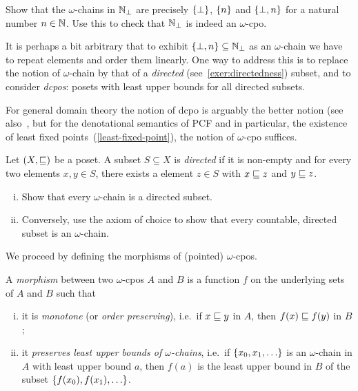 \begin{exercise}\label{exer:N_bot}
  Show that the \(\omega\)-chains in \(\mathbb N_\bot\) are precisely \(\{\bot\}\),
  \(\{n\}\) and \(\{\bot,n\}\) for a natural number \(n \in \mathbb N\).
  Use this to check that \(\mathbb N_\bot\) is indeed an \(\omega\)-cpo.
\end{exercise}

\begin{remark}
  It is perhaps a bit arbitrary that to exhibit
  \(\{\bot,n\} \subseteq \mathbb N_\bot\) as an \(\omega\)-chain we have to repeat
  elements and order them linearly.
  One way to address this is to replace the notion of \(\omega\)-chain by that
  of a \emph{directed} (see~\cref{exer:directedness}) subset, and to consider
  \emph{dcpos}: posets with least upper bounds for all directed subsets.

  For general domain theory the notion of dcpo is arguably the better notion
  (see also~\cite[Section~2.2.4]{AbramskyJung1994}, but for the denotational
  semantics of PCF and in particular, the existence of least fixed
  points~(\cref{least-fixed-point}), the notion of \(\omega\)-cpo suffices.
\end{remark}

\begin{exercise}\label{exer:directedness}
  Let \((X,{\sqsubseteq})\) be a poset. A subset \(S \subseteq X\) is \emph{directed}
  if it is non-empty and for every two elements \(x,y \in S\), there exists a
  element \(z \in S\) with \(x \sqsubseteq z\) and \(y \sqsubseteq z\).
  \begin{enumerate}[(i)]
  \item Show that every \(\omega\)-chain is a directed subset.
  \item Conversely, use the axiom of choice to show that every countable,
    directed subset is an \(\omega\)-chain.
  \end{enumerate}
\end{exercise}

We proceed by defining the morphisms of (pointed) \(\omega\)-cpos.
\begin{definition}\label{def:morphism}
  A \emph{morphism} between two \(\omega\)-cpos \(A\) and \(B\) is a function
  \(f\) on the underlying sets of \(A\) and \(B\) such that
  \begin{enumerate}[(i)]
  \item\label{monotone} it is \emph{monotone} (or \emph{order preserving}),
    i.e.\ if \(x \sqsubseteq y\) in \(A\), then \(f(x) \sqsubseteq f(y)\) in \(B\);
  \item\label{preserve-lub-of-omega-chains} it \emph{preserves least upper
      bounds of \(\omega\)-chains}, i.e.\ if \(\set{x_0,x_1,\dots}\) is an
    \(\omega\)-chain in \(A\) with least upper bound \(a\), then \(f(a)\) is the
    least upper bound in \(B\) of the subset \(\set{f(x_0),f(x_1),\dots}\).
  \end{enumerate}
\end{definition}

